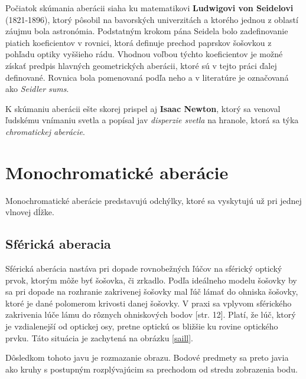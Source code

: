 Počiatok skúmania aberácii siaha ku matematikovi \textbf{Ludwigovi von Seidelovi} (1821-1896), ktorý
pôsobil na bavorských univerzitách a ktorého jednou z oblastí záujmu bola astronómia. \cite{seidel}
Podstatným krokom pána Seidela bolo zadefinovanie piatich koeficientov v rovnici, ktorá definuje
prechod paprskov šošovkou z pohľadu optiky vyššieho rádu. Vhodnou voľbou týchto koeficientov je 
možné získať predpis hlavných geometrických aberácii, ktoré sú v tejto práci ďalej definované. Rovnica bola pomenovaná podľa neho a 
v literatúre je označovaná ako \textit{Seidler sums}.

K skúmaniu aberácii ešte skorej prispel aj \textbf{Isaac Newton}, ktorý sa venoval ľudskému vnímaniu svetla a
popísal jav \textit{disperzie svetla} na hranole, ktorá sa týka \textit{chromatickej
aberácie}\cite{elert}.

\section{Monochromatické aberácie}
Monochromatické aberácie predstavujú odchýlky, ktoré sa vyskytujú už pri jednej vlnovej dĺžke.
\subsection{Sférická aberacia}
Sférická aberácia nastáva pri dopade rovnobežných ľúčov na sférický optický prvok, ktorým môže byť
šošovka, či zrkadlo. 
Podľa ideálneho modelu šošovky by sa pri dopade na rozhranie zakrivenej šošovky mal ľúč lámať do ohniska šošovky, ktoré
je dané polomerom krivosti danej šošovky. V praxi sa vplyvom sférického zakrivenia lúče lámu do rôznych
ohniskových bodov \cite{elisa}[str. 12]. Platí, že lúč, ktorý je vzdialenejší od optickej osy, pretne optickú os bližšie
ku rovine optického prvku. Táto situácia je zachytená na obrázku \ref{saill}.

Dôsledkom tohoto javu je rozmazanie obrazu. Bodové predmety sa preto javia ako kruhy s postupným
rozplývajúcim sa prechodom od stredu zobrazenia bodu.


